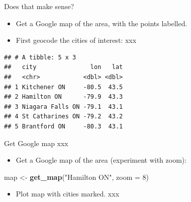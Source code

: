 \documentclass[ignorenonframetext,]{beamer}
\newenvironment{Shaded}{\begin{snugshade}}{\end{snugshade}}
\newcommand{\DataTypeTok}[1]{\textcolor[rgb]{0.13,0.29,0.53}{#1}}
\newcommand{\DecValTok}[1]{\textcolor[rgb]{0.00,0.00,0.81}{#1}}
\newcommand{\KeywordTok}[1]{\textcolor[rgb]{0.13,0.29,0.53}{\textbf{#1}}}
\newcommand{\NormalTok}[1]{#1}
\newcommand{\OperatorTok}[1]{\textcolor[rgb]{0.81,0.36,0.00}{\textbf{#1}}}
\newcommand{\StringTok}[1]{\textcolor[rgb]{0.31,0.60,0.02}{#1}}
\providecommand{\tightlist}{%
  \setlength{\itemsep}{0pt}\setlength{\parskip}{0pt}}
\begin{document}
\begin{frame}[fragile]{Does that make sense?}
\protect\hypertarget{does-that-make-sense}{}

\begin{itemize}
\item
  Get a Google map of the area, with the points labelled.
\item
  First geocode the cities of interest: xxx
\end{itemize}

\footnotesize

\begin{Shaded}
\end{Shaded}

\begin{verbatim}
## # A tibble: 5 x 3
##   city               lon   lat
##   <chr>            <dbl> <dbl>
## 1 Kitchener ON     -80.5  43.5
## 2 Hamilton ON      -79.9  43.3
## 3 Niagara Falls ON -79.1  43.1
## 4 St Catharines ON -79.2  43.2
## 5 Brantford ON     -80.3  43.1
\end{verbatim}

\normalsize

\end{frame}

\begin{frame}[fragile]{Get Google map xxx}
\protect\hypertarget{get-google-map-xxx}{}

\begin{itemize}
\tightlist
\item
  Get a Google map of the area (experiment with zoom):
\end{itemize}

\begin{Shaded}
\begin{Highlighting}[]
\NormalTok{map <-}\StringTok{ }\KeywordTok{get_map}\NormalTok{(}\StringTok{"Hamilton ON"}\NormalTok{, }\DataTypeTok{zoom =} \DecValTok{8}\NormalTok{)}
\end{Highlighting}
\end{Shaded}

\begin{itemize}
\tightlist
\item
  Plot map with cities marked. xxx
\end{itemize}

\end{frame}
\end{document}

